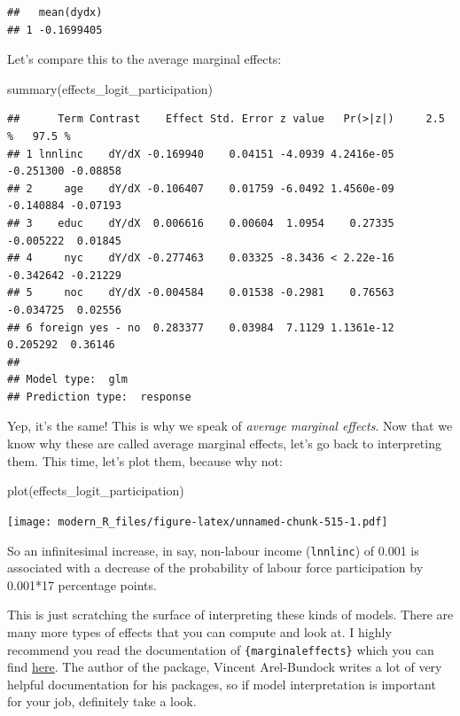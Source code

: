 \documentclass[
]{article}
\newenvironment{Shaded}{\begin{snugshade}}{\end{snugshade}}
\newcommand{\FunctionTok}[1]{\textcolor[rgb]{0.00,0.00,0.00}{#1}}
\newcommand{\NormalTok}[1]{#1}
\begin{document}
\begin{verbatim}
##   mean(dydx)
## 1 -0.1699405
\end{verbatim}

Let's compare this to the average marginal effects:

\begin{Shaded}
\begin{Highlighting}[]
\FunctionTok{summary}\NormalTok{(effects\_logit\_participation)}
\end{Highlighting}
\end{Shaded}

\begin{verbatim}
##      Term Contrast    Effect Std. Error z value   Pr(>|z|)     2.5 %   97.5 %
## 1 lnnlinc    dY/dX -0.169940    0.04151 -4.0939 4.2416e-05 -0.251300 -0.08858
## 2     age    dY/dX -0.106407    0.01759 -6.0492 1.4560e-09 -0.140884 -0.07193
## 3    educ    dY/dX  0.006616    0.00604  1.0954    0.27335 -0.005222  0.01845
## 4     nyc    dY/dX -0.277463    0.03325 -8.3436 < 2.22e-16 -0.342642 -0.21229
## 5     noc    dY/dX -0.004584    0.01538 -0.2981    0.76563 -0.034725  0.02556
## 6 foreign yes - no  0.283377    0.03984  7.1129 1.1361e-12  0.205292  0.36146
## 
## Model type:  glm 
## Prediction type:  response
\end{verbatim}

Yep, it's the same! This is why we speak of \emph{average marginal effects}. Now that we know why
these are called average marginal effects, let's go back to interpreting them. This time,
let's plot them, because why not:

\begin{Shaded}
\begin{Highlighting}[]
\FunctionTok{plot}\NormalTok{(effects\_logit\_participation)}
\end{Highlighting}
\end{Shaded}

\texttt{[image: modern\_R\_files/figure-latex/unnamed-chunk-515-1.pdf]}

So an infinitesimal increase, in say, non-labour income (\texttt{lnnlinc}) of 0.001 is associated with a
decrease of the probability of labour force participation by 0.001*17 percentage points.

This is just scratching the surface of interpreting these kinds of models. There are many more
types of effects that you can compute and look at. I highly recommend you read the documentation
of \texttt{\{marginaleffects\}} which you can find
\href{https://vincentarelbundock.github.io/marginaleffects/index.html}{here}. The author
of the package, Vincent Arel-Bundock writes a lot of very helpful documentation for his packages,
so if model interpretation is important for your job, definitely take a look.
\end{document}
